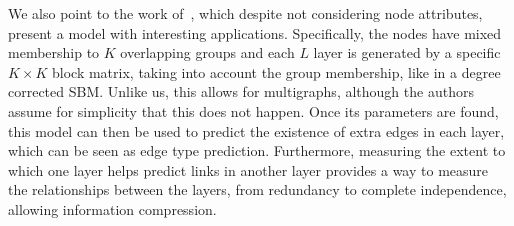 We also point to the work of~\textcite{DeBacco2017}, which despite not considering node attributes,
present a model with interesting applications. Specifically, the nodes have mixed membership to $K$
overlapping groups and each $L$ layer is generated by a specific $K\times K$ block matrix, taking
into account the group membership, like in a degree corrected SBM. Unlike us, this allows for
multigraphs, although the authors assume for simplicity that this does not happen. Once its
parameters are found, this model can then be used to predict the existence of extra edges in each
layer, which can be seen as edge type prediction. Furthermore, measuring the extent to which one
layer helps predict links in another layer provides a way to measure the relationships between the
layers, from redundancy to complete independence, allowing information compression.

